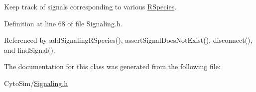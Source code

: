 Keep track of signals corresponding to various \hyperlink{classchem_1_1RSpecies}{R\-Species}. 



Definition at line 68 of file Signaling.\-h.



Referenced by add\-Signaling\-R\-Species(), assert\-Signal\-Does\-Not\-Exist(), disconnect(), and find\-Signal().



The documentation for this class was generated from the following file\-:\begin{DoxyCompactItemize}
\item 
Cyto\-Sim/\hyperlink{Signaling_8h}{Signaling.\-h}\end{DoxyCompactItemize}
